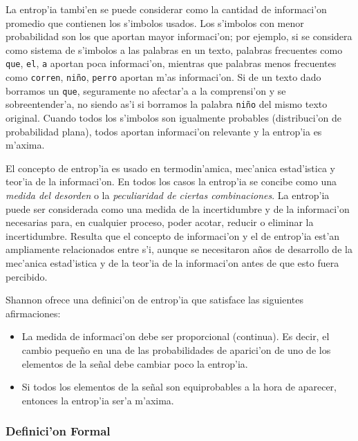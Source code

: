 \documentclass[a4paper,10pt]{article}
\begin{document}
\vspace*{5 mm}
La entrop'ia tambi'en se puede considerar como la cantidad de informaci'on promedio que contienen los s'imbolos usados. Los s'imbolos con menor probabilidad son los que aportan mayor informaci'on; por ejemplo, si se considera como sistema de s'imbolos a las palabras en un texto, palabras frecuentes como \texttt{que}, \texttt{el}, \texttt{a} aportan poca informaci'on, mientras que palabras menos frecuentes como \texttt{corren}, \texttt{ni\~no}, \texttt{perro} aportan m'as informaci'on. Si de un texto dado borramos un \texttt{que}, seguramente no afectar'a a la comprensi'on y se sobreentender'a, no siendo as'i si borramos la palabra \texttt{ni\~no} del mismo texto original. Cuando todos los s'imbolos son igualmente probables (distribuci'on de probabilidad plana), todos aportan informaci'on relevante y la entrop'ia es m'axima.

\vspace*{5 mm}
El concepto de entrop'ia es usado en termodin'amica, mec'anica estad'istica y teor'ia de la informaci'on. En todos los casos la entrop'ia se concibe como una \textit{medida del desorden} o la \textit{peculiaridad de ciertas combinaciones}. La entrop'ia puede ser considerada como una medida de la incertidumbre y de la informaci'on necesarias para, en cualquier proceso, poder acotar, reducir o eliminar la incertidumbre. Resulta que el concepto de informaci'on y el de entrop'ia est'an ampliamente relacionados entre s'i, aunque se necesitaron a\~nos de desarrollo de la mec'anica estad'istica y de la teor'ia de la informaci'on antes de que esto fuera percibido.

\vspace*{5 mm}
Shannon ofrece una definici'on de entrop'ia que satisface las siguientes afirmaciones:

\begin{itemize}
	\item La medida de informaci'on debe ser proporcional (continua). Es decir, el cambio peque\~no en una de las probabilidades de aparici'on de uno de los elementos de la se\~nal debe cambiar poco la entrop'ia.
	\item Si todos los elementos de la se\~nal son equiprobables a la hora de aparecer, entonces la entrop'ia ser'a m'axima.	
\end{itemize}

\subsubsection{Definici'on Formal}
\end{document}
